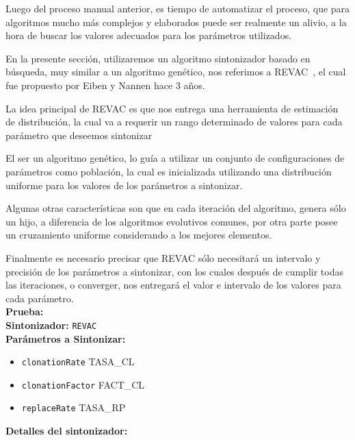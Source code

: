 Luego del proceso manual anterior, es tiempo de automatizar el proceso,
que para algoritmos mucho más complejos y elaborados puede ser realmente un alivio,
a la hora de buscar los valores adecuados para los parámetros utilizados.

En la presente sección, utilizaremos un algoritmo sintonizador basado en búsqueda,
muy similar a un algoritmo genético, nos referimos a REVAC~\cite{REVAC},
el cual fue propuesto por Eiben y Nannen hace 3 años.

La idea principal de REVAC es que nos entrega una herramienta de estimación
de distribución, la cual va a requerir un rango determinado de valores para
cada parámetro que deseemos sintonizar

El ser un algoritmo genético, lo guía a utilizar un
conjunto de configuraciones de parámetros como población, la cual es inicializada
utilizando una distribución uniforme para los valores de los parámetros a sintonizar.

Algunas otras características son que en cada iteración del algoritmo, genera sólo
un hijo, a diferencia de los algoritmos evolutivos comunes, por otra parte posee
un cruzamiento uniforme considerando a los mejores elementos.

Finalmente es necesario precisar que REVAC sólo necesitará un intervalo y precisión
de los parámetros a sintonizar, con los cuales después de cumplir todas las iteraciones,
o converger, nos entregará el valor e intervalo de los valores para cada parámetro.\\ 

\textbf{Prueba:} \\

\textbf{Sintonizador:} \texttt{REVAC}\\

\textbf{Parámetros a Sintonizar:}\\

\begin{itemize}
	\item \texttt{clonationRate} TASA\_CL \blue{[0,1]}
	\item \texttt{clonationFactor} FACT\_CL \blue{[0,1]}
	\item \texttt{replaceRate} TASA\_RP \blue{[0,1]}
\end{itemize}

\textbf{Detalles del sintonizador:}\\

